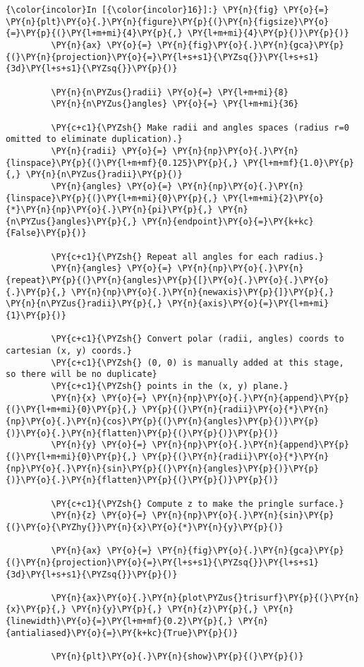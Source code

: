     \begin{Verbatim}[commandchars=\\\{\}]
{\color{incolor}In [{\color{incolor}16}]:} \PY{n}{fig} \PY{o}{=} \PY{n}{plt}\PY{o}{.}\PY{n}{figure}\PY{p}{(}\PY{n}{figsize}\PY{o}{=}\PY{p}{(}\PY{l+m+mi}{4}\PY{p}{,} \PY{l+m+mi}{4}\PY{p}{)}\PY{p}{)}
         \PY{n}{ax} \PY{o}{=} \PY{n}{fig}\PY{o}{.}\PY{n}{gca}\PY{p}{(}\PY{n}{projection}\PY{o}{=}\PY{l+s+s1}{\PYZsq{}}\PY{l+s+s1}{3d}\PY{l+s+s1}{\PYZsq{}}\PY{p}{)}
         
         \PY{n}{n\PYZus{}radii} \PY{o}{=} \PY{l+m+mi}{8}
         \PY{n}{n\PYZus{}angles} \PY{o}{=} \PY{l+m+mi}{36}
         
         \PY{c+c1}{\PYZsh{} Make radii and angles spaces (radius r=0 omitted to eliminate duplication).}
         \PY{n}{radii} \PY{o}{=} \PY{n}{np}\PY{o}{.}\PY{n}{linspace}\PY{p}{(}\PY{l+m+mf}{0.125}\PY{p}{,} \PY{l+m+mf}{1.0}\PY{p}{,} \PY{n}{n\PYZus{}radii}\PY{p}{)}
         \PY{n}{angles} \PY{o}{=} \PY{n}{np}\PY{o}{.}\PY{n}{linspace}\PY{p}{(}\PY{l+m+mi}{0}\PY{p}{,} \PY{l+m+mi}{2}\PY{o}{*}\PY{n}{np}\PY{o}{.}\PY{n}{pi}\PY{p}{,} \PY{n}{n\PYZus{}angles}\PY{p}{,} \PY{n}{endpoint}\PY{o}{=}\PY{k+kc}{False}\PY{p}{)}
         
         \PY{c+c1}{\PYZsh{} Repeat all angles for each radius.}
         \PY{n}{angles} \PY{o}{=} \PY{n}{np}\PY{o}{.}\PY{n}{repeat}\PY{p}{(}\PY{n}{angles}\PY{p}{[}\PY{o}{.}\PY{o}{.}\PY{o}{.}\PY{p}{,} \PY{n}{np}\PY{o}{.}\PY{n}{newaxis}\PY{p}{]}\PY{p}{,} \PY{n}{n\PYZus{}radii}\PY{p}{,} \PY{n}{axis}\PY{o}{=}\PY{l+m+mi}{1}\PY{p}{)}
         
         \PY{c+c1}{\PYZsh{} Convert polar (radii, angles) coords to cartesian (x, y) coords.}
         \PY{c+c1}{\PYZsh{} (0, 0) is manually added at this stage,  so there will be no duplicate}
         \PY{c+c1}{\PYZsh{} points in the (x, y) plane.}
         \PY{n}{x} \PY{o}{=} \PY{n}{np}\PY{o}{.}\PY{n}{append}\PY{p}{(}\PY{l+m+mi}{0}\PY{p}{,} \PY{p}{(}\PY{n}{radii}\PY{o}{*}\PY{n}{np}\PY{o}{.}\PY{n}{cos}\PY{p}{(}\PY{n}{angles}\PY{p}{)}\PY{p}{)}\PY{o}{.}\PY{n}{flatten}\PY{p}{(}\PY{p}{)}\PY{p}{)}
         \PY{n}{y} \PY{o}{=} \PY{n}{np}\PY{o}{.}\PY{n}{append}\PY{p}{(}\PY{l+m+mi}{0}\PY{p}{,} \PY{p}{(}\PY{n}{radii}\PY{o}{*}\PY{n}{np}\PY{o}{.}\PY{n}{sin}\PY{p}{(}\PY{n}{angles}\PY{p}{)}\PY{p}{)}\PY{o}{.}\PY{n}{flatten}\PY{p}{(}\PY{p}{)}\PY{p}{)}
         
         \PY{c+c1}{\PYZsh{} Compute z to make the pringle surface.}
         \PY{n}{z} \PY{o}{=} \PY{n}{np}\PY{o}{.}\PY{n}{sin}\PY{p}{(}\PY{o}{\PYZhy{}}\PY{n}{x}\PY{o}{*}\PY{n}{y}\PY{p}{)}
         
         \PY{n}{ax} \PY{o}{=} \PY{n}{fig}\PY{o}{.}\PY{n}{gca}\PY{p}{(}\PY{n}{projection}\PY{o}{=}\PY{l+s+s1}{\PYZsq{}}\PY{l+s+s1}{3d}\PY{l+s+s1}{\PYZsq{}}\PY{p}{)}
         
         \PY{n}{ax}\PY{o}{.}\PY{n}{plot\PYZus{}trisurf}\PY{p}{(}\PY{n}{x}\PY{p}{,} \PY{n}{y}\PY{p}{,} \PY{n}{z}\PY{p}{,} \PY{n}{linewidth}\PY{o}{=}\PY{l+m+mf}{0.2}\PY{p}{,} \PY{n}{antialiased}\PY{o}{=}\PY{k+kc}{True}\PY{p}{)}
         
         \PY{n}{plt}\PY{o}{.}\PY{n}{show}\PY{p}{(}\PY{p}{)}
\end{Verbatim}


